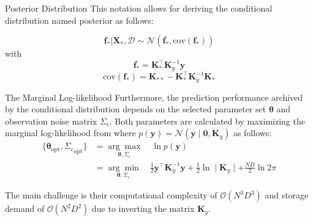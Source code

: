 \begin{frame}{Posterior Distribution}
	This notation allows for deriving the conditional distribution named posterior as follows:
	
	\begin{equation}\label{sogp_posterior}
	\mathbf{f}_*|\mathbf{X}_*, \mathcal{D} \sim \mathcal{N}(\bar{\mathbf{f}_*},\text{cov}(\mathbf{f}_*))
	\end{equation}
	with
	\begin{equation}\label{sogp_posterior_mean}
	\bar{\mathbf{f}_*} = \mathbf{K}_*^\top \mathbf{K}_y^{-1} \mathbf{y}
	\end{equation}
	\begin{equation}\label{sogp_posterior_cov}
	\text{cov}(\mathbf{f}_*) = \mathbf{K}_{**} -  \mathbf{K}_*^\top \mathbf{K}_y^{-1} \mathbf{K}_*
	\end{equation}
\end{frame}

\begin{frame}{The Marginal Log-likelihood}
	 Furthermore, the prediction performance archived by the conditional distribution depends on the selected parameter set $\bm{\theta}$ and observation noise matrix $\Sigma_\epsilon$. Both parameters are calculated by maximizing the marginal log-likelihood from  where $p(\mathbf{y}) = \mathcal{N}(\mathbf{y} \mid \bm{0}, \mathbf{K}_y)$ as follows:
	\begin{equation}\label{eq:sogp_nlml_opt}
	\begin{aligned}
	\{\bm{\theta}_{\text{opt}}, {\Sigma_\epsilon}_{\text{opt}}\} &= \underset{\bm{\theta}, \Sigma_\epsilon}{\arg\max} \quad \ln p(\mathbf{y})\\
	&= \underset{\bm{\theta}, \Sigma_\epsilon}{\arg\min} \quad \frac{1}{2} \mathbf{y}^\top \mathbf{K}_y^{-1} \mathbf{y} + \frac{1}{2} \ln \mid \mathbf{K}_y \mid + \frac{ND}{2} \ln 2\pi
	\end{aligned}
	\end{equation}
	
	The main challenge is their computational complexity of $\mathcal{O}(N^3D^3)$ and storage demand of $\mathcal{O}(N^2D^2)$ due to inverting the matrix $\mathbf{K}_y$.
\end{frame}

